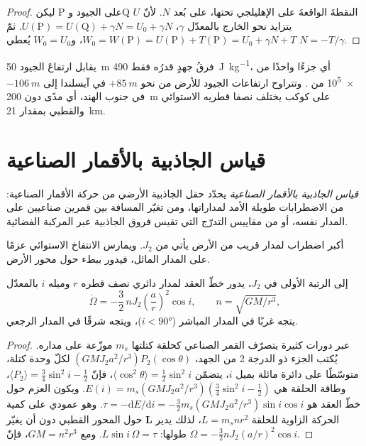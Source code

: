 \begin{proof}
ليكن P على الجيود وQ النقطةَ الواقعةَ على الإهليلجي تحتها، على بُعد
$N$. لأنّ $U$ يتزايد نحو الخارج بالمعدّل $\gamma$،
$U(\mathrm P) = U(\mathrm Q) + \gamma N = U_0 + \gamma N$. ثمّ
$W_0 = W(\mathrm P) = U(\mathrm P) + T(\mathrm P) = U_0 + \gamma N + T$،
و$W_0 = U_0$ يُعطي $N = -T/\gamma$.
\end{proof}

يقابل ارتفاعَ الجيود \qty{50}{m} فرقُ جهدٍ قدرُه فقط
\qty{490}{J.kg^{-1}}، أي جزءًا واحدًا من \num{e5} من . وتتراوح ارتفاعات الجيود
للأرض من نحو $+\qty{85}{m}$ في آيسلندا إلى
$-\qty{106}{m}$ في جنوب الهند،
أي مدًى دون \qty{200}{m} على كوكب يختلف نصفا قطريه الاستوائي والقطبي
بمقدار \qty{21}{km}.

\section{قياس الجاذبية بالأقمار الصناعية}

\begin{definition}\label{def:b3:gravity-geodesy:satgrav}
\emph{قياس الجاذبية بالأقمار الصناعية} يحدّد حقل الجاذبية الأرضي
من حركة الأقمار الصناعية: من الاضطرابات طويلة الأمد
لمداراتها، ومن تغيّر المسافة بين قمرين صناعيين على المدار نفسه،
أو من مقاييس التدرّج التي تقيس فروق الجاذبية عبر
المركبة الفضائية.
\end{definition}

أكبر اضطراب لمدار قريب من الأرض يأتي من $J_2$. ويمارس
الانتفاخ الاستوائي عزمًا على المدار المائل، فيدور ببطء
حول محور الأرض.

\begin{proposition}\label{prop:b3:gravity-geodesy:nodal}
إلى الرتبة الأولى في $J_2$، يدور خطّ العقد لمدار دائري نصف قطره $r$
وميله $i$ بالمعدّل
\[
  \dot\Omega = -\frac32\,nJ_2\left(\frac ar\right)^2\cos i,\qquad n = \sqrt{GM/r^3} ,
\]
يتجه غربًا في المدار المباشر ($i < \ang{90}$)، ويتجه شرقًا في المدار الرجعي.
\end{proposition}

\begin{proof}
عبر دورات كثيرة يتصرّف القمر الصناعي كحلقة كتلتها $m_s$ موزّعة على
مداره. يُكتب الجزء ذو الدرجة 2 من الجهد،
$(GMJ_2a^2/r^3)P_2(\cos\theta)$ لكلّ وحدة كتلة، متوسّطًا على دائرة مائلة
بميل $i$، يتضمّن $\langle\cos^2\theta\rangle = \tfrac12\sin^2i$، فإنّ
$\langle P_2\rangle = \tfrac34\sin^2i - \tfrac12$، وطاقة الحلقة هي
$E(i) = m_s(GMJ_2a^2/r^3)(\tfrac34\sin^2i - \tfrac12)$. ويكون العزم حول خطّ
العقد هو $\tau = -\mathrm dE/\mathrm di = -\tfrac32m_s(GMJ_2a^2/r^3)\sin
i\cos i$. وهو عمودي على كمية الحركة الزاوية للحلقة $L = m_snr^2$، لذلك
يدير $\mathbf L$ حول المحور القطبي دون أن يغيّر طولها:
$L\sin i\,\dot\Omega = \tau$. ومع $GM = n^2r^3$، فإنّ $\dot\Omega =
-\tfrac32nJ_2(a/r)^2\cos i$.
\end{proof}

